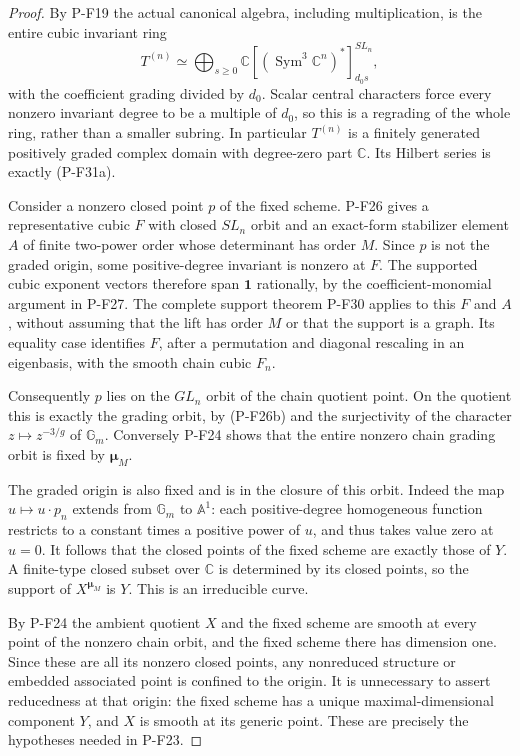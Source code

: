 \documentclass[11pt,a4paper]{article}
\begin{document}
\begin{proof}
By P-F19 the actual canonical algebra, including multiplication,
is the entire cubic invariant ring
\[
 T^{(n)}\simeq
   \bigoplus_{s\ge0}
      \mathbb C[(\operatorname{Sym}^3\mathbb C^n)^*]^{SL_n}_{d_0s},
 \tag{P-F31e}
\]
with the coefficient grading divided by $d_0$. Scalar central
characters force every nonzero invariant degree to be a multiple
of $d_0$, so this is a regrading of the whole ring, rather than
a smaller subring. In particular $T^{(n)}$ is a finitely generated
positively graded complex domain with degree-zero part $\mathbb C$.
Its Hilbert series is exactly (P-F31a).

Consider a nonzero closed point $p$ of the fixed scheme.
P-F26 gives a representative cubic $F$ with closed $SL_n$ orbit
and an exact-form stabilizer element $A$ of finite two-power order
whose determinant has order $M$. Since $p$ is not the graded
origin, some positive-degree invariant is nonzero at $F$.
The supported cubic exponent vectors therefore span
$\mathbf1$ rationally, by the coefficient-monomial argument
in P-F27. The complete support theorem P-F30 applies to this
$F$ and $A$, without assuming that the lift has order $M$
or that the support is a graph. Its equality case identifies
$F$, after a permutation and diagonal rescaling in an eigenbasis,
with the smooth chain cubic $F_n$.

Consequently $p$ lies on the $GL_n$ orbit of the chain quotient
point. On the quotient this is exactly the grading orbit, by
(P-F26b) and the surjectivity of the character
$z\mapsto z^{-3/g}$ of $\mathbb G_m$. Conversely P-F24 shows
that the entire nonzero chain grading orbit is fixed by
$\boldsymbol\mu_M$.

The graded origin is also fixed and is in the closure of this
orbit. Indeed the map $u\mapsto u\cdot p_n$ extends from
$\mathbb G_m$ to $\mathbb A^1$: each positive-degree homogeneous
function restricts to a constant times a positive power of $u$,
and thus takes value zero at $u=0$. It follows that the closed
points of the fixed scheme are exactly those of $Y$. A
finite-type closed subset over $\mathbb C$ is determined by
its closed points, so the support of $X^{\boldsymbol\mu_M}$
is $Y$. This is an irreducible curve.

By P-F24 the ambient quotient $X$ and the fixed scheme are
smooth at every point of the nonzero chain orbit, and the fixed
scheme there has dimension one. Since these are all its
nonzero closed points, any nonreduced structure or embedded
associated point is confined to the origin. It is unnecessary
to assert reducedness at that origin: the fixed scheme has a
unique maximal-dimensional component $Y$, and $X$ is smooth
at its generic point. These are precisely the hypotheses
needed in P-F23.


\end{proof}
\end{document}
